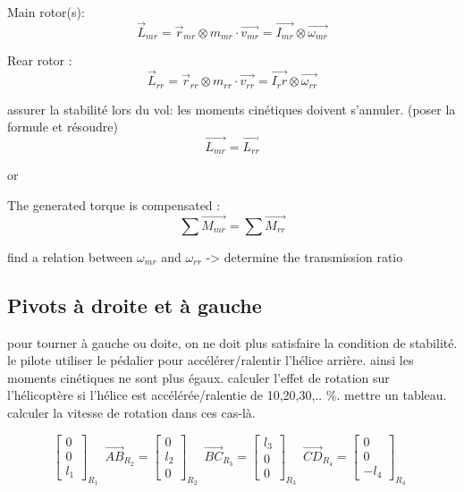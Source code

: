 \documentclass[12pt,a4paper]{article}
\begin{document}
	Main rotor(s):
	\begin{equation}
		\vec{L}_{mr}=\vec{r}_{mr} \otimes m_{mr} \cdot \vec{v_{mr}}=\vec{I_{mr}} \otimes \vec{\omega_{mr}}
	\end{equation}
	
	
	Rear rotor : 
	\begin{equation}
		\vec{L}_{rr}=\vec{r}_{rr} \otimes m_{rr} \cdot \vec{v_{rr}}=\vec{I_rr} \otimes \vec{\omega_{rr}}
	\end{equation}
	
	assurer la stabilité lors du vol: les moments cinétiques doivent s'annuler. (poser la formule et résoudre)
	\begin{equation}
		\vec{L_{mr}}=\vec{L_{rr}}
	\end{equation}
	
	or
	
	The generated torque is compensated : 
	\begin{equation}
		\sum \vec{M_{mr}}=\sum \vec{M_{rr}}
	\end{equation}
	
	find a relation between $\omega_{mr}$ and $\omega_{rr}$ -> determine the transmission ratio
	
	\subsection{Pivots à droite et à gauche}
	pour tourner à gauche ou doite, on ne doit plus satisfaire la condition de stabilité. le pilote utiliser le pédalier pour accélérer/ralentir l'hélice arrière. ainsi les moments cinétiques ne sont plus égaux.
	\medbreak
	calculer l'effet de rotation sur l'hélicoptère si l'hélice est accélérée/ralentie de 10,20,30,.. $\%$. mettre un tableau. calculer la vitesse de rotation dans ces cas-là. 
	
	
	\begin{equation}
		\begin{bmatrix}
			0 \\
			0\\
			l_1
		\end{bmatrix}_{R_{1}} \enspace
		\vec{AB}_{R_{2}}=
		\begin{bmatrix}
			0 \\
			l_2\\
			0
		\end{bmatrix}_{R_{2}} \enspace
		\vec{BC}_{R_{3}}=
		\begin{bmatrix}
			l_3 \\
			0\\
			0
		\end{bmatrix}_{R_{3}} \enspace
		\vec{CD}_{R_{4}}=
		\begin{bmatrix}
			0 \\
			0\\
			-l_4
		\end{bmatrix}_{R_{4}} \enspace
	\end{equation}
	
\end{document}
